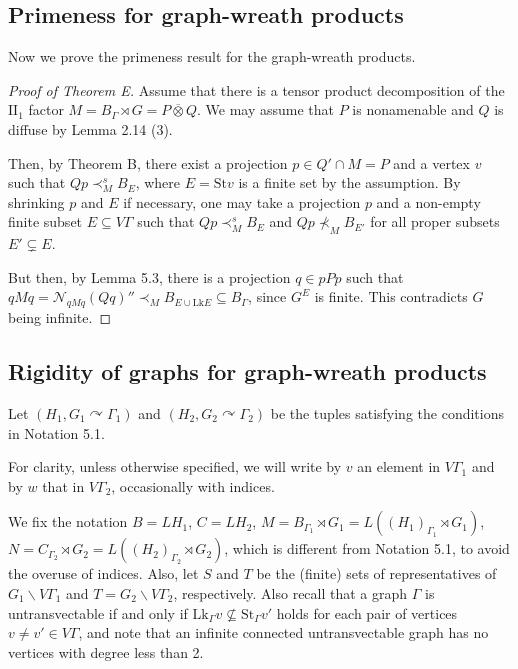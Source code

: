 \documentclass{amsart}
\theoremstyle{definition}
\renewcommand{\subset}{\subseteq}
\newcommand{\action}{\curvearrowright}
\newcommand{\twoone}{$\mathrm{II}_1$\xspace}
\begin{document}
\subsection{Primeness for graph-wreath products}
Now we prove the primeness result for the graph-wreath products. 

\begin{proof}[Proof of Theorem E]
Assume that there is a tensor product decomposition of the \twoone factor  $M=B_{\Gamma}\rtimes G=P\overline{\otimes} Q$. 
We may assume that $P$ is nonamenable and $Q$ is diffuse by Lemma 2.14 (3). 

Then, by Theorem B, there exist a projection $p\in Q'\cap M=P$
and a vertex $v$ such that $Qp\prec^s_M B_{E}$, where $E=\mathrm{St}v$ is a finite set by the assumption.  
By shrinking $p$ and $E$ if necessary, 
one may take a projection $p$ and a non-empty finite subset $E\subset V\Gamma$ 
such that $Qp\prec^s_M B_{E}$ and $Qp\nprec_M B_{E'}$ for all proper subsets $E' \subsetneq E$. 

But then, by Lemma 5.3, there is a projection $q\in pPp$ such that 
$qMq=\mathcal{N}_{qMq}(Qq)''\prec_M B_{E\cup \mathrm{Lk}E}\subset B_{\Gamma}$, 
since $G^E$ is finite. This contradicts $G$ being infinite. 
\end{proof}

\subsection{Rigidity of graphs for graph-wreath products}

Let $(H_1, G_1\action \Gamma_1)$ and $(H_2, G_2\action \Gamma_2)$ 
be the tuples satisfying the conditions in Notation 5.1. 

For clarity, unless otherwise specified, we will write by $v$ an element in $V\Gamma_1$ and by $w$ that in $V\Gamma_2$, occasionally with indices.  

We fix the notation $B=LH_1$, $C=LH_2$, $M=B_{\Gamma_1}\rtimes G_1=L((H_1)_{\Gamma_1}\rtimes G_1)$, $N=C_{\Gamma_2}\rtimes G_2=L((H_2)_{\Gamma_2}\rtimes G_2)$, 
which is different from Notation 5.1, 
to avoid the overuse of indices. 
Also, let $S$ and $T$ be the (finite) sets of representatives of $G_1\backslash V\Gamma_1$ and $T=G_2\backslash V\Gamma_2$, respectively. 
Also recall that a graph $\Gamma$ is untransvectable if and only if 
$\mathrm{Lk}_{\Gamma}v \nsubseteq \mathrm{St}_{\Gamma}v' $ holds for each pair of vertices $v\neq v'\in V\Gamma$, 
and note that an infinite connected untransvectable graph has no vertices with degree less than 2. 
\end{document}
